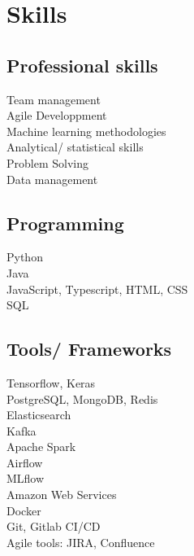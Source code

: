 \documentclass[letterpaper]{deedy-resume} %
\begin{document}
\begin{minipage}[t]{0.33\textwidth} %


\section{Skills}

\subsection{Professional skills}
Team management\\
Agile Developpment \\
Machine learning methodologies\\
Analytical/ statistical skills\\
Problem Solving\\
Data management\\

\sectionspace %

\subsection{Programming}
Python \\
Java \\
JavaScript, Typescript, HTML, CSS\\
SQL \\

\sectionspace %
\subsection{Tools/ Frameworks}
Tensorflow, Keras \\
PostgreSQL, MongoDB, Redis \\
Elasticsearch \\
Kafka \\
Apache Spark\\
Airflow \\
MLflow \\

Amazon Web Services \\
Docker \\
Git, Gitlab CI/CD\\
Agile tools: JIRA, Confluence\\


\end{minipage}
\end{document}

